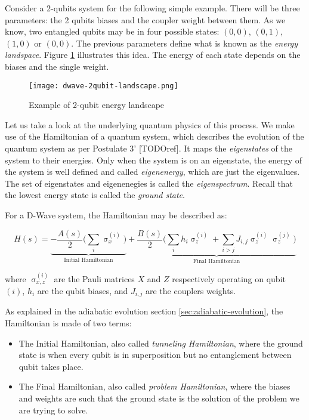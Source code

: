 Consider a 2-qubits system for the following simple example. There will be three parameters: the 2 qubits biases and the coupler weight between them. As we know, two entangled qubits may be in four possible states: $(0,0)$, $(0,1)$, $(1,0)$ or $(0,0)$. The previous parameters define what is known as the \emph{energy landspace}. Figure \ref{fig:dwave-2qubit-landscape} illustrates this idea. The energy of each state depends on the biases and the single weight.

\begin{figure}[h]
	\texttt{[image: dwave-2qubit-landscape.png]}
	\centering
	\caption{Example of 2-qubit energy landscape \cite{DWaveDoc-QuantumAnnealing}}
	\label{fig:dwave-2qubit-landscape}
\end{figure}

Let us take a look at the underlying quantum physics of this process. We make use of the Hamiltonian of a quantum system, which describes the evolution of the quantum system as per Postulate 3' [TODOref]. It maps the \emph{eigenstates} of the system to their energies. Only when the system is on an eigenstate, the energy of the system is well defined and called \emph{eigenenergy}, which are just the eigenvalues. The set of eigenstates and eigenenegies is called the \emph{eigenspectrum}. Recall that the lowest energy state is called the \emph{ground state}.

For a D-Wave system, the Hamiltonian may be described as:

$$ H(s) = \underbrace{- \frac{A(s)}{2} \bigg( \sum_i \upsigma_x^{(i)} \bigg)}_\text{Initial Hamiltonian} 
			+ \underbrace{\frac{B(s)}{2} \bigg( \sum_i h_i \upsigma_z^{(i)} + \sum_ {i > j} J_{i,j} \upsigma_z^{(i)} \upsigma_z^{(j)} \bigg)}_\text{Final Hamiltonian} $$

where $\upsigma^{(i)}_{x,z}$ are the Pauli matrices $X$ and $Z$ respectively operating on qubit $(i)$, $h_i$ are the qubit biases, and $J_{i,j}$ are the couplers weights.

As explained in the adiabatic evolution section \ref{sec:adiabatic-evolution}, the Hamiltonian is made of two terms:

\begin{itemize}
	\item The Initial Hamiltonian, also called \emph{tunneling Hamiltonian}, where the ground state is when every qubit is in superposition but no entanglement between qubit takes place.
	\item The Final Hamiltonian, also called \emph{problem Hamiltonian}, where the biases and weights are such that the ground state is the solution of the problem we are trying to solve.
\end{itemize}

